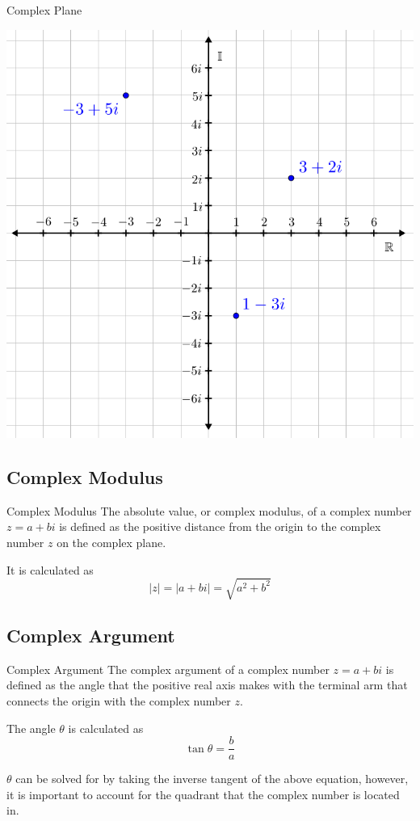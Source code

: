 \documentclass{beamer}
\begin{document}
\begin{frame}{Complex Plane}
    \begin{center}
        \includegraphics[scale = 0.25]{Graphics/Week_12/ArgandPlane.png}
    \end{center}
\end{frame}

\subsection{Complex Modulus}
\begin{frame}{Complex Modulus}
    The absolute value, or complex modulus, of a complex number $z=a + bi$ is defined as the positive distance from the origin to the complex number $z$ on the complex plane. \newline
    
    It is calculated as $$|z|=|a + bi| = \sqrt{a^2 + b^2}$$
\end{frame}

\subsection{Complex Argument}
\begin{frame}{Complex Argument}
    The complex argument of a complex number $z = a + bi$ is defined as the angle that the positive real axis makes with the terminal arm that connects the origin with the complex number $z$. \newline
    
    The angle $\theta$ is calculated as $$\tan{\theta} = \frac{b}{a}$$ 
    
    $\theta$ can be solved for by taking the inverse tangent of the above equation, however, it is important to account for the quadrant that the complex number is located in.
\end{frame}
\end{document}
